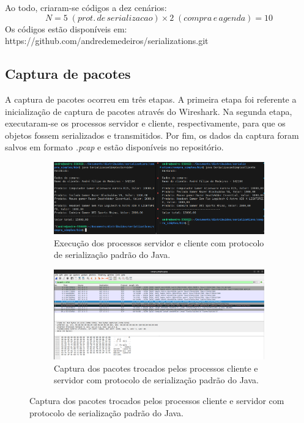 \documentclass{article}
\begin{document}
Ao todo, criaram-se códigos a dez cenários:
\begin{equation}
    N = 5 \;(prot.\, de \,serializacao) \times 2 \;(compra\, e\, agenda) = 10
\end{equation}
Os códigos estão disponíveis em: {https://github.com/andredemedeiros/serializations.git}

\subsection{Captura de pacotes}
A captura de pacotes ocorreu em três etapas. A primeira etapa foi referente a inicialização de captura de pacotes através do Wireshark. Na segunda etapa, executaram-se os processos servidor e cliente, respectivamente, para que os objetos fossem serializados e transmitidos. 
Por fim, os dados da captura foram salvos em formato \textit{.pcap} e estão disponíveis no repositório. 

\begin{figure}[H]
    \centering
    \caption{Captura de pacotes da serialização padrão no cenário de requisição de compra.}
    \begin{subfigure}[b]{0.7\textwidth}
        \includegraphics[width=\textwidth]{imgs/compra_simples_term.png}
        \caption{Execução dos processos servidor e cliente com protocolo de serialização padrão do Java.}
        \label{fig:clock_original}
    \end{subfigure}%

    \begin{subfigure}[b]{0.7\textwidth}
        \includegraphics[width=\textwidth]{imgs/compra_simples_wire.png}
        \caption{Captura dos pacotes trocados pelos processos cliente e servidor com protocolo de serialização padrão do Java.}
        \label{fig:clock_300dpi}
    \end{subfigure}%
    \label{fig:clock_comparison}
\end{figure}
\end{document}
